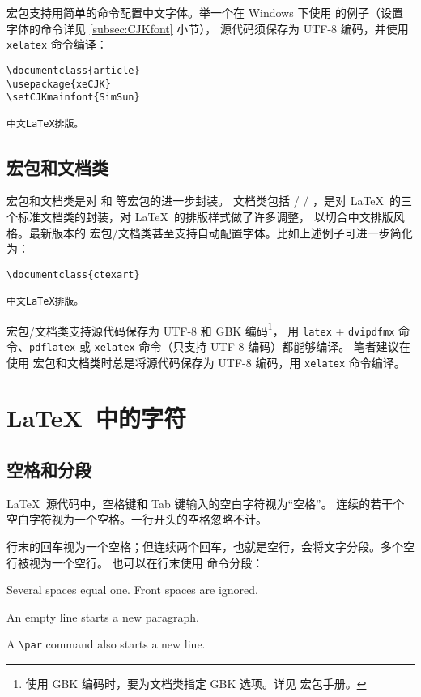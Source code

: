  宏包支持用简单的命令配置中文字体。举一个在 Windows 下使用  的例子（设置字体的命令详见 \ref{subsec:CJKfont} 小节），
源代码须保存为 UTF-8 编码，并使用 \texttt{xelatex} 命令编译：
\begin{verbatim}
\documentclass{article}
\usepackage{xeCJK}
\setCJKmainfont{SimSun}

中文LaTeX排版。

\end{verbatim}

\subsection{ 宏包和文档类}\label{subsec:ctex}

 宏包和文档类是对  和  等宏包的进一步封装。 文档类包括
 /  / ，是对 \LaTeX\ 的三个标准文档类的封装，对 \LaTeX\ 的排版样式做了许多调整，
以切合中文排版风格。最新版本的  宏包/文档类甚至支持自动配置字体。比如上述例子可进一步简化为：
\begin{verbatim}
\documentclass{ctexart}

中文LaTeX排版。

\end{verbatim}

 宏包/文档类支持源代码保存为 UTF-8 和 GBK 编码\footnote{使用 GBK 编码时，要为文档类指定 GBK 选项。详见  宏包手册。}，
用 \texttt{latex} + \texttt{dvipdfmx} 命令、\texttt{pdflatex} 或 \texttt{xelatex} 命令（只支持 UTF-8 编码）都能够编译。
笔者建议在使用  宏包和文档类时总是将源代码保存为 UTF-8 编码，用 \texttt{xelatex} 命令编译。

\section{\LaTeX\ 中的字符}\label{sec:text-symbols}

\subsection{空格和分段}\label{subsec:spaces}

\LaTeX\ 源代码中，空格键和 Tab 键输入的空白字符视为“空格”。
连续的若干个空白字符视为一个空格。一行开头的空格忽略不计。

行末的回车视为一个空格；但连续两个回车，也就是空行，会将文字分段。多个空行被视为一个空行。
也可以在行末使用  命令分段：
\begin{example}
Several spaces     equal one.
  Front spaces are ignored.

An empty line starts a new
paragraph.\par
A \verb|\par| command also 
starts a new line.
\end{example}

